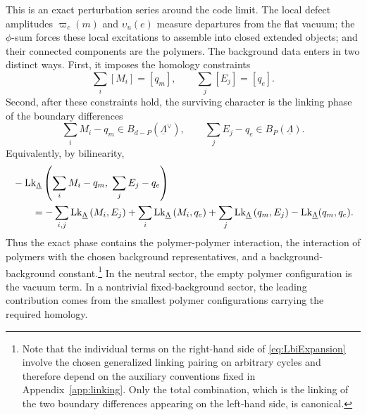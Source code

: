 This is an exact perturbation series around the code limit. The local defect amplitudes
\(\varpi_c(m)\) and \(\upsilon_u(e)\) measure departures from the flat vacuum; the
\(\phi\)-sum forces these local excitations to assemble into closed extended objects; and
their connected components are the polymers. The background data enters in two distinct
ways. First, it imposes the homology constraints
\begin{equation}
\sum_i[M_i]=[q_m],
\qquad
\sum_j[E_j]=[q_e].
\end{equation}
Second, after these constraints hold, the surviving character is the linking phase of the
boundary differences
\begin{equation}
\sum_i M_i-q_m\in B_{d-P}(\underline\Lambda^\vee),
\qquad
\sum_j E_j-q_e\in B_P(\underline\Lambda).
\end{equation}
Equivalently, by bilinearity,
\begin{equation}
\begin{aligned}
	&-\mathrm{Lk}_{\underline\Lambda}
	\left(
	\sum_i M_i-q_m,\;
	\sum_j E_j-q_e
	\right)
	\\
	&\qquad
	=
	-\sum_{i,j} \mathrm{Lk}_{\underline\Lambda}
	\left(
	M_i,E_j
	\right)
	+
	\sum_i \mathrm{Lk}_{\underline\Lambda}
	\left(
	M_i,q_e
	\right)
	+
	\sum_j \mathrm{Lk}_{\underline\Lambda}
	\left(
	q_m,E_j
	\right)
	-
	\mathrm{Lk}_{\underline\Lambda}(q_m,q_e).
\end{aligned}
\label{eq:LbiExpansion}
\end{equation}
Thus the exact phase contains the polymer-polymer interaction, the interaction of polymers
with the chosen background representatives, and a background-background constant.\footnote{Note that the individual terms on the right-hand side of
	\eqref{eq:LbiExpansion} involve the chosen generalized linking pairing on
	arbitrary cycles and therefore depend on the auxiliary conventions fixed in
	Appendix~\ref{app:linking}. Only the total combination, which is the linking of
	the two boundary differences appearing on the left-hand side, is canonical.} In the
neutral sector, the empty polymer configuration is the vacuum term. In a nontrivial
fixed-background sector, the leading contribution comes from the smallest polymer
configurations carrying the required homology.




